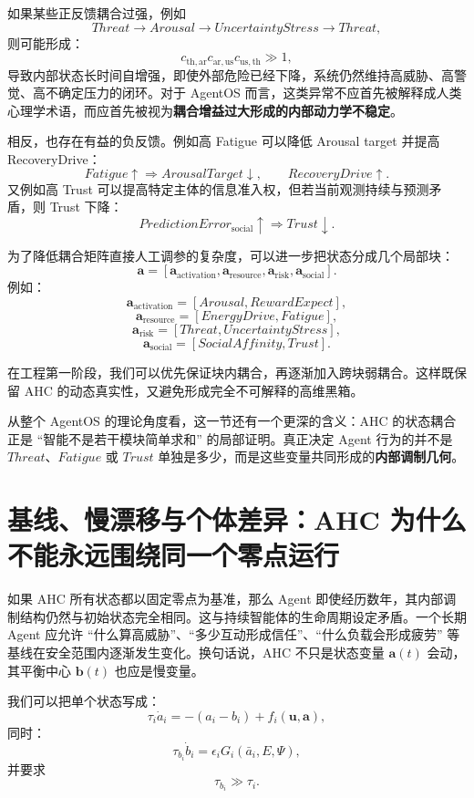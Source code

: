 如果某些正反馈耦合过强，例如
\[
Threat
\rightarrow
Arousal
\rightarrow
UncertaintyStress
\rightarrow
Threat,
\]
则可能形成：
\[
c_{\mathrm{th,ar}}
c_{\mathrm{ar,us}}
c_{\mathrm{us,th}}
\gg 1,
\]
导致内部状态长时间自增强，即使外部危险已经下降，系统仍然维持高威胁、高警觉、高不确定压力的闭环。对于 AgentOS 而言，这类异常不应首先被解释成人类心理学术语，而应首先被视为\textbf{耦合增益过大形成的内部动力学不稳定}。

相反，也存在有益的负反馈。例如高 Fatigue 可以降低 Arousal target 并提高 RecoveryDrive：
\[
Fatigue\uparrow
\Rightarrow
ArousalTarget\downarrow,
\qquad
RecoveryDrive\uparrow.
\]
又例如高 Trust 可以提高特定主体的信息准入权，但若当前观测持续与预测矛盾，则 Trust 下降：
\[
PredictionError_{\mathrm{social}}\uparrow
\Rightarrow
Trust\downarrow.
\]

为了降低耦合矩阵直接人工调参的复杂度，可以进一步把状态分成几个局部块：
\[
\mathbf a
=
[
\mathbf a_{\mathrm{activation}},
\mathbf a_{\mathrm{resource}},
\mathbf a_{\mathrm{risk}},
\mathbf a_{\mathrm{social}}
].
\]
例如：
\[
\mathbf a_{\mathrm{activation}}
=
[Arousal,RewardExpect],
\]
\[
\mathbf a_{\mathrm{resource}}
=
[EnergyDrive,Fatigue],
\]
\[
\mathbf a_{\mathrm{risk}}
=
[Threat,UncertaintyStress],
\]
\[
\mathbf a_{\mathrm{social}}
=
[SocialAffinity,Trust].
\]

在工程第一阶段，我们可以优先保证块内耦合，再逐渐加入跨块弱耦合。这样既保留 AHC 的动态真实性，又避免形成完全不可解释的高维黑箱。

从整个 AgentOS 的理论角度看，这一节还有一个更深的含义：AHC 的状态耦合正是 ``智能不是若干模块简单求和'' 的局部证明。真正决定 Agent 行为的并不是 $Threat$、$Fatigue$ 或 $Trust$ 单独是多少，而是这些变量共同形成的\textbf{内部调制几何}。


\section{基线、慢漂移与个体差异：AHC 为什么不能永远围绕同一个零点运行}

如果 AHC 所有状态都以固定零点为基准，那么 Agent 即使经历数年，其内部调制结构仍然与初始状态完全相同。这与持续智能体的生命周期设定矛盾。一个长期 Agent 应允许 ``什么算高威胁''、``多少互动形成信任''、``什么负载会形成疲劳'' 等基线在安全范围内逐渐发生变化。换句话说，AHC 不只是状态变量 $\mathbf a(t)$ 会动，其平衡中心 $\mathbf b(t)$ 也应是慢变量。

我们可以把单个状态写成：
\[
\tau_i
\dot a_i
=
-
\left(
a_i-b_i
\right)
+
f_i(\mathbf u,\mathbf a),
\]
同时：
\[
\tau_{b_i}\dot b_i
=
\epsilon_i
G_i(
\bar a_i,
E,
\Psi
),
\]
并要求
\[
\tau_{b_i}
\gg
\tau_i.
\]

